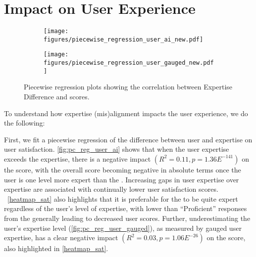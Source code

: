 \section{Impact on User Experience}\label{impact_experience}
\begin{figure*}[ht!]
    \centering
    \begin{subfigure}[b]{0.49\linewidth}
        \texttt{[image: figures/piecewise\_regression\_user\_ai\_new.pdf]}
        \caption{}
        \label{fig:pc_reg_user_ai}
    \end{subfigure}
    \begin{subfigure}[b]{0.49\linewidth}
        \texttt{[image: figures/piecewise\_regression\_user\_gauged\_new.pdf]}
        \caption{}
        \label{fig:pc_reg_user_gauged}
    \end{subfigure}
    \caption{Piecewise regression plots showing the correlation between Expertise Difference and  scores.}
\end{figure*}

To understand how expertise (mis)alignment impacts the user experience, we do the following:

First, we fit a piecewise regression of the difference between user and  expertise on user satisfaction. \autoref{fig:pc_reg_user_ai} shows that when the user expertise exceeds the  expertise, there is a negative impact $(R^{2}=0.11, p=1.36E^{-141})$ on the  score, with the overall  score becoming negative in absolute terms once the user is one level more expert than the . Increasing gaps in user expertise over  expertise are associated with continually lower user satisfaction scores.
~\autoref{heatmap_sat} also highlights that it is preferable for the  to be quite expert regardless of the user's level of expertise, with lower than ``Proficient'' responses from the  generally leading to decreased user  scores. Further, underestimating the user's expertise level (\autoref{fig:pc_reg_user_gauged}), as measured by gauged user expertise, has a clear negative impact $(R^{2}=0.03, p=1.06E^{-26})$ on the  score, also highlighted in \autoref{heatmap_sat}.

